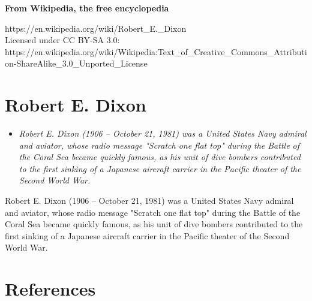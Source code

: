 \textbf{From Wikipedia, the free encyclopedia}

https://en.wikipedia.org/wiki/Robert\_E.\_Dixon\\
Licensed under CC BY-SA 3.0:\\
https://en.wikipedia.org/wiki/Wikipedia:Text\_of\_Creative\_Commons\_Attribution-ShareAlike\_3.0\_Unported\_License

\section{Robert E. Dixon}\label{robert-e.-dixon}

\begin{itemize}
\item
  \emph{Robert E. Dixon (1906 -- October 21, 1981) was a United States
  Navy admiral and aviator, whose radio message "Scratch one flat top"
  during the Battle of the Coral Sea became quickly famous, as his unit
  of dive bombers contributed to the first sinking of a Japanese
  aircraft carrier in the Pacific theater of the Second World War.}
\end{itemize}

Robert E. Dixon (1906 -- October 21, 1981) was a United States Navy
admiral and aviator, whose radio message "Scratch one flat top" during
the Battle of the Coral Sea became quickly famous, as his unit of dive
bombers contributed to the first sinking of a Japanese aircraft carrier
in the Pacific theater of the Second World War.

\section{References}\label{references}

